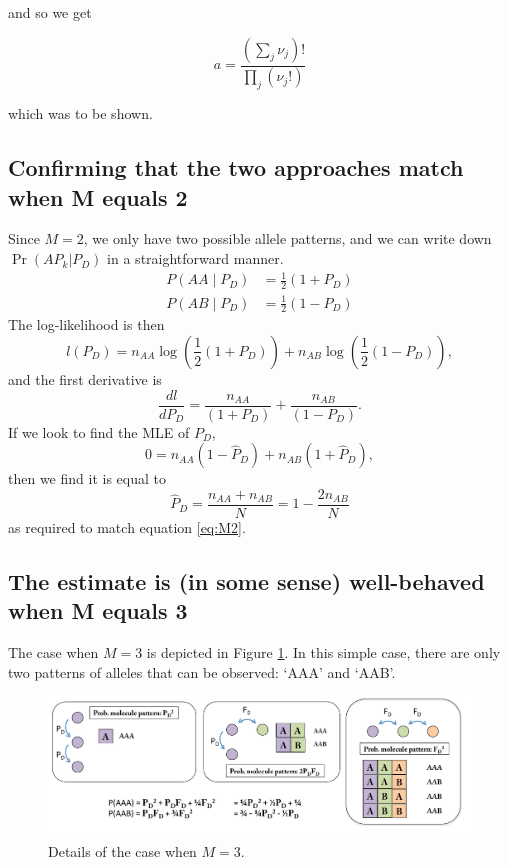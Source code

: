 \documentclass{article}
\begin{document}
\noindent and so we get 

\begin{equation} 
a = \frac{\left( \sum_j  \nu_j \right)!}{\prod_{j} \left( \nu_j! \right)}
\end{equation}

\noindent which was to be shown. 

\subsection{Confirming that the two approaches match when M equals 2}

Since $M=2$, we only have two possible allele patterns, and we can write down $\Pr(AP_k | P_D)$ in a straightforward manner.
\begin{align}
P(AA \mid P_D) &= \frac{1}{2}(1+P_D)\\
P(AB \mid P_D) &= \frac{1}{2}(1-P_D)
\end{align}
The log-likelihood is then
\begin{equation}
l(P_D) = n_{AA}\log(\frac{1}{2}(1+P_D))+n_{AB}\log(\frac{1}{2}(1-P_D)),
\end{equation}
\noindent and the first derivative is
\begin{equation}
\frac{dl}{dP_D} = \frac{n_{AA}}{(1+P_D)}+\frac{n_{AB}}{(1-P_D)}.
\end{equation}
If we look to find the MLE of $P_D$,
\begin{equation}
0 = n_{AA}(1-\hat{P}_D)+n_{AB}(1+\hat{P}_D),
\end{equation}
\noindent then we find it is equal to
\begin{equation}
\hat{P}_D = \frac{n_{AA}+n_{AB}}{N} = 1 - \frac{2n_{AB}}{N}
\end{equation}
\noindent as required to match equation \ref{eq:M2}.



\subsection{The estimate is (in some sense) well-behaved when M equals 3}

 The case when $M=3$ is depicted in Figure \ref{M3example}. In this simple case, there are only two patterns of alleles that can be observed: `AAA' and `AAB'.

\begin{figure}[tbh]
\begin{center}
\includegraphics[width=\textwidth]{SuppFigM3.pdf}
\end{center}
\caption{Details of the case when $M=3$.
}
\label{M3example}
\end{figure}
\end{document}
